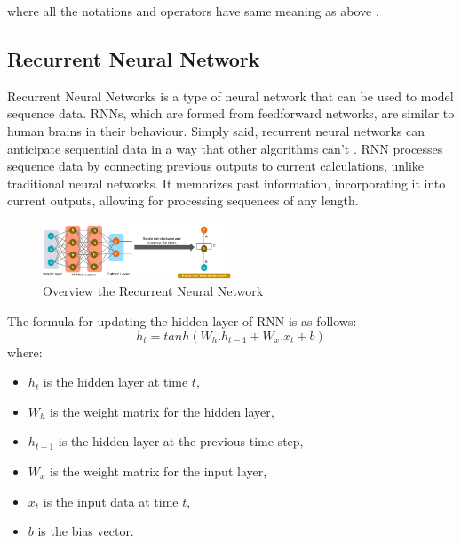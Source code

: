 \documentclass{ieeeojies}
\begin{document}
where all the notations and operators have same meaning as above \cite{b4}.
\subsection{Recurrent Neural Network}
Recurrent Neural Networks is a type of neural network that can be used to model sequence data. RNNs, which are formed from feedforward networks, are similar to human brains in their behaviour. Simply said, recurrent neural networks can anticipate sequential data in a way that other algorithms can’t \cite{b10}. RNN processes sequence data by connecting previous outputs to current calculations, unlike traditional neural networks. It memorizes past information, incorporating it into current outputs, allowing for processing sequences of any length.
\begin{figure} [H]
    \centering
    \includegraphics[width=0.5\textwidth]{bibliography/Figure/RNN_overview.png}
    \caption{Overview the Recurrent Neural Network}
    \label{fig:rnn-overview}
\end{figure}

The formula for updating the hidden layer of RNN is as follows:
\begin{equation}
    h_t = tanh(W_{h}.h_{t - 1} + W_x.x_t + b)
\end{equation}
where:
\begin{itemize}
    \item $h_t$ is the hidden layer at time $t$,
    \item $W_h$ is the weight matrix for the hidden layer,
    \item $h_{t-1}$ is the hidden layer at the previous time step,
    \item $W_x$ is the weight matrix for the input layer,
    \item $x_t$ is the input data at time $t$,
    \item $b$ is the bias vector.
\end{itemize}
\end{document}
